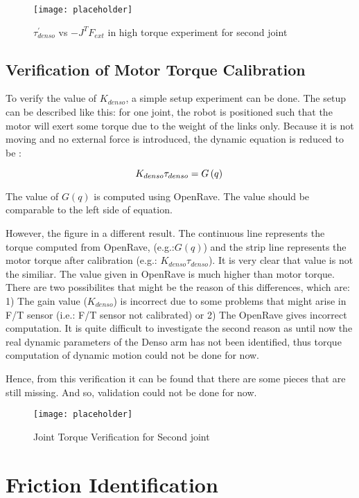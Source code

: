 \begin{figure}[h]
    \centering
    \texttt{[image: placeholder]}
    \caption{$\tau_{denso}^{\prime}$ vs $- J^{T} F_{ext}$ in high torque experiment for second joint}
    \label{fig: tor calibration}
\end{figure}

\subsection{Verification of Motor Torque Calibration}
To verify the value of $K_{denso}$, a simple setup experiment can be done. The setup can be described like this: for one joint, the robot is positioned such that the motor will exert some torque due to the weight of the links only. Because it is not moving and no external force is introduced, the dynamic equation is reduced to be :

\begin{equation}
  K_{denso} \tau_{denso} = G\left(q \right) \\
\end{equation}

The value of $G\left(q \right)$ is computed using OpenRave. The value should be comparable to the left side of equation. 

However, the figure in  a different result. The continuous line represents the torque computed from OpenRave, (e.g.:$G\left(q \right)$) and the strip line represents the motor torque after calibration (e.g.: $K_{denso} \tau_{denso}$). It is very clear that value is not the similiar. The value given in OpenRave is much higher than motor torque. There are two possibilites that might be the reason of this differences, which are: 1) The gain value ($ K_{denso} $) is incorrect due to some problems that might arise in F/T sensor (i.e.: F/T sensor not calibrated) or 2) The OpenRave gives incorrect computation. It is quite difficult to investigate the second reason as until now the real dynamic parameters of the Denso arm has not been identified, thus torque computation of dynamic motion could not be done for now. 

Hence, from this verification it can be found that there are some pieces that are still missing. And so, validation could not be done for now.
 
\begin{figure}[h]
    \centering
    \texttt{[image: placeholder]}
    \caption{Joint Torque Verification for Second joint}
    \label{fig: tor verification}
\end{figure}


\section{Friction Identification}




